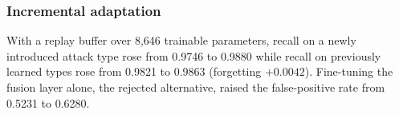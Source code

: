 \subsubsection{Incremental adaptation}
With a replay buffer over 8,646 trainable parameters, recall on a newly introduced attack type rose from 0.9746 to 0.9880 while recall on previously learned types rose from 0.9821 to 0.9863 (forgetting $+0.0042$). Fine-tuning the fusion layer alone, the rejected alternative, raised the false-positive rate from 0.5231 to 0.6280.
